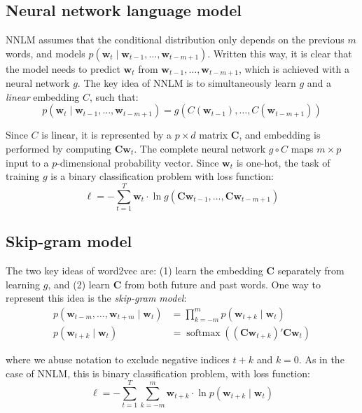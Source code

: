 \documentclass{amsart}
\newcommand\vw{\symbf{w}}
\newcommand\mc{\symbf{C}}
\begin{document}
\subsection{Neural network language model}

NNLM \cite{Bengio2003} assumes that the conditional distribution only depends
on the previous \(m\) words, and models \(p(\vw_t \mid \vw_{t-1}, \ldots,
\vw_{t - m + 1})\). Written this way, it is clear that the model needs to
predict \(\vw_t\) from \(\vw_{t-1}, \ldots, \vw_{t - m + 1}\), which is
achieved with a neural network \(g\). The key idea of NNLM is to simultaneously
learn \(g\) and a \emph{linear} embedding \(C\), such that:
%
\begin{equation}
  p(\vw_t \mid \vw_{t-1}, \ldots, \vw_{t - m + 1}) = g(C(\vw_{t-1}), \ldots, C(\vw_{t - m + 1}))
\end{equation}

Since \(C\) is linear, it is represented by a \(p \times d\) matrix \(\mc\),
and embedding is performed by computing \(\mc \vw_t\). The complete neural
network \(g \circ C\) maps \(m \times p\) input to a \(p\)-dimensional
probability vector. Since \(\vw_t\) is one-hot, the task of training \(g\) is a
binary classification problem with loss function:
%
\begin{equation}
  \ell = -\sum_{t=1}^T \vw_t \cdot \ln g(\mc\vw_{t-1}, \ldots, \mc\vw_{t - m + 1})
\end{equation}

\subsection{Skip-gram model}

The two key ideas of word2vec \cite{Mikolov2013a,Mikolov2013b} are: (1) learn
the embedding \(\mc\) separately from learning \(g\), and (2) learn \(\mc\)
from both future and past words. One way to represent this idea is the
\emph{skip-gram model}:
%
\begin{align}
  p(\vw_{t-m}, \ldots, \vw_{t+m} \mid \vw_t) &= \prod_{k=-m}^{m} p(\vw_{t+k} \mid \vw_t)\\
  p(\vw_{t+k} \mid \vw_t) &= \operatorname{softmax}((\mc\vw_{t+k})' \mc\vw_t)
\end{align}

where we abuse notation to exclude negative indices \(t + k\) and \(k = 0\). As
in the case of NNLM, this is binary classification problem, with loss function:
%
\begin{equation}
  \ell = -\sum_{t=1}^T \sum_{k=-m}^m \vw_{t + k} \cdot \ln p(\vw_{t+k} \mid \vw_t)
  \label{eq:skipgram}
\end{equation}
\end{document}
